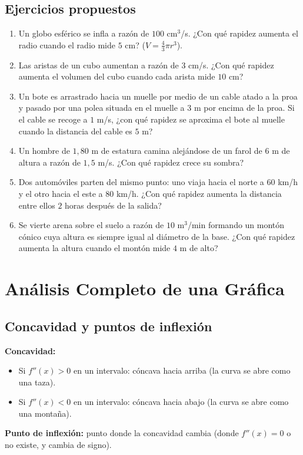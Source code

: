 \documentclass[12pt, a4paper]{article}
\begin{document}
\newpage

\subsection{Ejercicios propuestos}

\begin{enumerate}[leftmargin=*, resume]
  \item \facil{} Un globo esférico se infla a razón de $100$ cm$^3$/s. ¿Con qué rapidez aumenta el radio cuando el radio mide $5$ cm? ($V = \frac{4}{3}\pi r^3$).
  \item \facil{} Las aristas de un cubo aumentan a razón de $3$ cm/s. ¿Con qué rapidez aumenta el volumen del cubo cuando cada arista mide $10$ cm?
  \item \medio{} Un bote es arrastrado hacia un muelle por medio de un cable atado a la proa y pasado por una polea situada en el muelle a $3$ m por encima de la proa. Si el cable se recoge a $1$ m/s, ¿con qué rapidez se aproxima el bote al muelle cuando la distancia del cable es $5$ m?
  \item \medio{} Un hombre de $1{,}80$ m de estatura camina alejándose de un farol de $6$ m de altura a razón de $1{,}5$ m/s. ¿Con qué rapidez crece su sombra?
  \item \dificil{} Dos automóviles parten del mismo punto: uno viaja hacia el norte a $60$ km/h y el otro hacia el este a $80$ km/h. ¿Con qué rapidez aumenta la distancia entre ellos $2$ horas después de la salida?
  \item \dificil{} Se vierte arena sobre el suelo a razón de $10$ m$^3$/min formando un montón cónico cuya altura es siempre igual al diámetro de la base. ¿Con qué rapidez aumenta la altura cuando el montón mide $4$ m de alto?
\end{enumerate}


\section{Análisis Completo de una Gráfica}

\subsection{Concavidad y puntos de inflexión}

\begin{cuadroteoria}
  \textbf{Concavidad:}
  \begin{itemize}[leftmargin=*]
    \item Si $f''(x) > 0$ en un intervalo: cóncava hacia arriba (la curva se abre como una taza).
    \item Si $f''(x) < 0$ en un intervalo: cóncava hacia abajo (la curva se abre como una montaña).
  \end{itemize}

  \textbf{Punto de inflexión:} punto donde la concavidad cambia (donde $f''(x) = 0$ o no existe, y cambia de signo).
\end{cuadroteoria}
\end{document}
